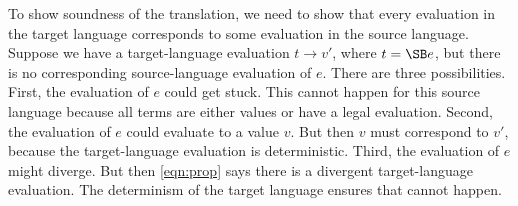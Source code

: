 To show soundness of the translation, we need to show that every
evaluation in the target language corresponds to some evaluation in the
source language. Suppose we have a target-language evaluation
$t\to v'$, where $t = \SB e$, but there is no corresponding
source-language evaluation of $e$. There are three possibilities.
First, the evaluation of $e$ could get stuck. This cannot happen for
this source language because all terms are either values or have a
legal evaluation. Second, the evaluation of $e$ could evaluate to a
value $v$. But then $v$ must correspond to $v'$, because the
target-language evaluation is deterministic. Third, the evaluation of
$e$ might diverge. But then \eqref{eqn:prop} says there is a
divergent target-language evaluation. The determinism of the
target language ensures that cannot happen.
